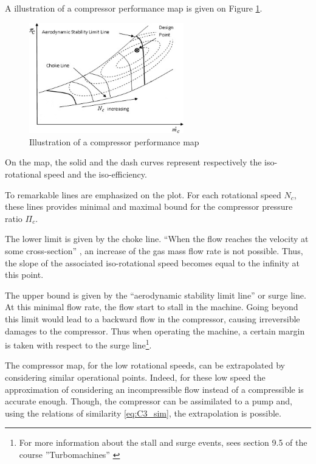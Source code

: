 A illustration of a compressor performance map is given on Figure \ref{fig:C3_compmap}.
\begin{figure}[h]
    \centering
    \includegraphics[width=0.6\textwidth]{Comp_Map.png}
    \caption{Illustration of a compressor performance map \cite{Ghorbanian2009}}
    \label{fig:C3_compmap}
\end{figure}

On the map, the solid and the dash curves represent respectively the iso-rotational speed and the iso-efficiency.

To remarkable lines are emphasized on the plot. For each rotational speed \(N_c\), these lines provides minimal and maximal bound for the compressor pressure ratio \(\Pi_c\).

The lower limit is given by the choke line. “When the flow reaches the velocity at some cross-section” \cite{Ghorbanian2009}, an increase of the gas mass flow rate is not possible. Thus, the slope of the associated iso-rotational speed becomes equal to the infinity at this point.

The upper bound is given by the “aerodynamic stability limit line'' or surge line. At this minimal flow rate, the flow start to stall in the machine. Going beyond this limit would lead to a backward flow in the compressor, causing irreversible damages to the compressor. Thus when operating the machine, a certain margin is taken with respect to the surge line\footnote{For more information about the stall and surge events, sees section 9.5 of the course ''Turbomachines'' \cite{Hillewaert2019}}.

The compressor map, for the low rotational speeds, can be extrapolated by considering similar operational points. Indeed, for these low speed the approximation of considering an incompressible flow instead of a compressible is accurate enough. Though, the compressor can be assimilated to a pump and, using the relations of similarity \ref{eq:C3_sim}, the extrapolation is possible.

